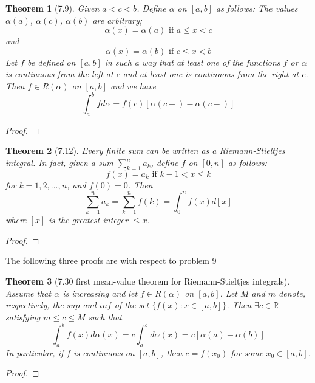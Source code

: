 \documentclass[aps,pra,notitlepage,amsmath,amssymb,letterpaper,12pt]{revtex4-1}
\newtheorem{theorem}{Theorem}
\begin{document}
\begin{theorem}[7.9]
Given $a < c < b$. Define $\alpha$ on $[a,b]$ as follows: The values $\alpha(a)$, $\alpha(c)$, $\alpha(b)$ are arbitrary;
\[\alpha(x) = \alpha(a) \textrm{ if } a \leq x < c\]
and
\[\alpha(x) = \alpha(b) \textrm{ if } c \leq x < b\]
Let $f$ be defined on $[a,b]$ in such a way that at least one of the functions $f$ or $\alpha$ is continuous from the left at $c$ and at least one is continuous from the right at $c$. Then $f \in R(\alpha)$ on $[a,b]$ and we have
\[\int_{a}^{b} f d\alpha = f(c)[\alpha(c+) - \alpha(c-)]\]
\end{theorem}
\begin{proof}

\end{proof}

\begin{theorem}[7.12]
Every finite sum can be written as a Riemann-Stieltjes integral. In fact, given a sum $\sum_{k=1}^{n} a_{k}$, define $f$ on $[0,n]$ as follows:
\[f(x) = a_{k}  \textrm{  if  }  k-1 < x \leq k\]
for $k=1,2,...,n$, and $f(0) = 0$. Then
\[\sum_{k=1}^{n}a_{k} = \sum_{k=1}^{n}f(k) = \int_{0}^{n}f(x)d[x]\]
where $[x]$ is the greatest integer $\leq x$.
\end{theorem}
\begin{proof}
\end{proof}

The following three proofs are with respect to problem 9
\begin{theorem}[7.30 first mean-value theorem for Riemann-Stieltjes integrals]
Assume that $\alpha$ is increasing and let $f \in R(\alpha)$ on $[a,b]$. Let $M$ and $m$ denote, respectively, the $sup$ and $inf$ of the set $\{f(x):x \in [a,b]\}$. Then $\exists c \in \mathbb{R}$ satisfying $m \leq c \leq M$ such that
\[\int_{a}^{b}f(x)d\alpha(x) = c\int_{a}^{b}d\alpha(x) = c[\alpha(a)-\alpha(b)]\]
In particular, if $f$ is continuous on $[a,b]$, then $c=f(x_{0})$ for some $x_{0} \in [a,b]$.
\end{theorem}
\begin{proof}
\end{proof}
\end{document}

